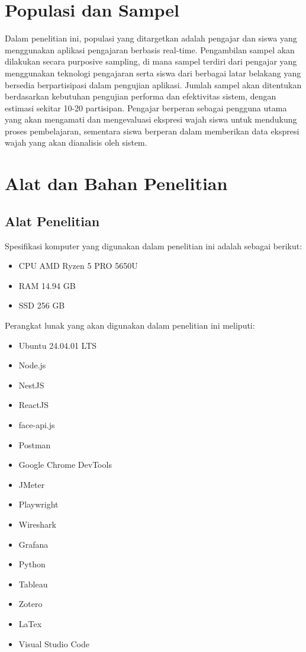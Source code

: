 \section{Populasi dan Sampel}
Dalam penelitian ini, populasi yang ditargetkan adalah pengajar dan siswa yang menggunakan aplikasi pengajaran berbasis real-time. Pengambilan sampel akan dilakukan secara purposive sampling, di mana sampel terdiri dari pengajar yang menggunakan teknologi pengajaran serta siswa dari berbagai latar belakang yang bersedia berpartisipasi dalam pengujian aplikasi. Jumlah sampel akan ditentukan berdasarkan kebutuhan pengujian performa dan efektivitas sistem, dengan estimasi sekitar 10-20 partisipan. Pengajar berperan sebagai pengguna utama yang akan mengamati dan mengevaluasi ekspresi wajah siswa untuk mendukung proses pembelajaran, sementara siswa berperan dalam memberikan data ekspresi wajah yang akan dianalisis oleh sistem.

\section{Alat dan Bahan Penelitian}
\subsection{Alat Penelitian}
Spesifikasi komputer yang digunakan dalam penelitian ini adalah sebagai berikut:
\begin{itemize}
  \item CPU AMD Ryzen 5 PRO 5650U
  \item RAM 14.94 GB
  \item SSD 256 GB
\end{itemize}

\hspace{-32pt} Perangkat lunak yang akan digunakan dalam penelitian ini meliputi:
\begin{itemize}
  \item Ubuntu 24.04.01 LTS
  \item Node.js
  \item NestJS
  \item ReactJS
  \item face-api.js
  \item Postman
  \item Google Chrome DevTools
  \item JMeter
  \item Playwright
  \item Wireshark
  \item Grafana
  \item Python
  \item Tableau
  \item Zotero
  \item LaTex
  \item Visual Studio Code
\end{itemize}

